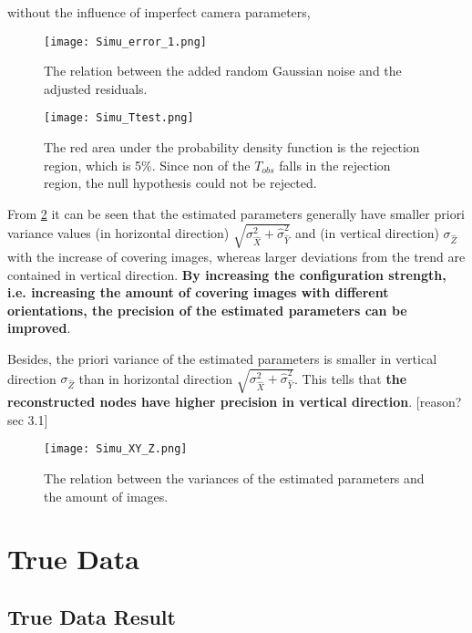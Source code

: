 without the influence of imperfect camera parameters, 
\begin{figure}
  \centering
  \texttt{[image: Simu\_error\_1.png]}
  \caption{\small The relation between the added random Gaussian noise and the adjusted residuals.}
  \label{fig:SimuError}
  \vspace{1cm}
  \centering
  \texttt{[image: Simu\_Ttest.png]}
  \caption{\small The red area under the probability density function is the rejection region, which is 5\%. Since non of the $T_{obs}$ falls in the rejection region, the null hypothesis could not be rejected.}
  \label{fig:SimuTtest}
\end{figure}

\clearpage


From \cref{fig:SimuSigmaxx} it can be seen that the estimated parameters generally have smaller priori variance values (in horizontal direction) $\sqrt{\sigma_{\hat{X}}^2+\hat{\sigma}_{\hat{Y}}^2}$ and (in vertical direction) $\sigma_{\hat{Z}}$ with the increase of covering images, whereas larger deviations from the trend are contained in vertical direction. \textbf{By increasing the configuration strength, i.e. increasing the amount of covering images with different orientations, the precision of the estimated parameters can be improved}.

Besides, the priori variance of the estimated parameters is smaller in vertical direction $\sigma_{\hat{Z}}$ than in horizontal direction $\sqrt{\sigma_{\hat{X}}^2+\hat{\sigma}_{\hat{Y}}^2}$. This tells that \textbf{the reconstructed nodes have higher precision in vertical direction}. [reason? sec 3.1]


\begin{figure}
  \centering
  \texttt{[image: Simu\_XY\_Z.png]}
  \caption{\small The relation between the variances of the estimated parameters and the amount of images.}
  \label{fig:SimuSigmaxx}
\end{figure}

\clearpage
\section{True Data}
\label{sec:truedata}

\subsection{True Data Result}
\label{subsec:trueresult}


